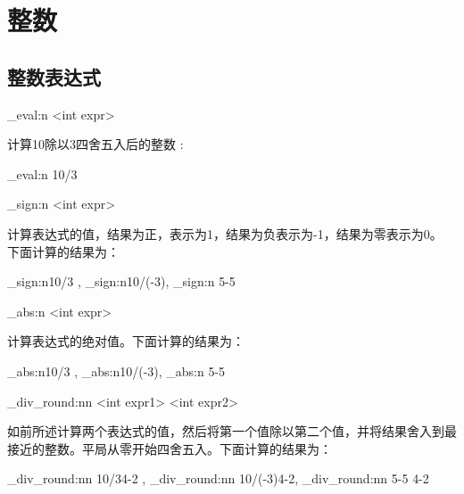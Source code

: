 \section{整数}
\subsection{整数表达式}



\setlength\parskip{0.4ex plus 0.2ex minus 0.2ex}%
\setlength\leftskip{0em}%
\setlength\rightskip{0em}%
\setlength\parindent{2em}%
\begin{my}
	\int_eval:n {<int expr>}
\end{my}

计算10除以3四舍五入后的整数	:

\begin{examplee}	
	\ExplSyntaxOn		
	\int_eval:n {10/3} 	
	\ExplSyntaxOff
\end{examplee}

\begin{my}
	\int_sign:n {<int expr>}
\end{my}

计算表达式的值，结果为正，表示为1，结果为负表示为-1，结果为零表示为0。
下面计算的结果为：

\begin{examplee}
	\ExplSyntaxOn		
	\int_sign:n{10/3} ,
	\int_sign:n{10/(-3)},
	\int_sign:n {5-5}	
	\ExplSyntaxOff
	
\end{examplee}	

\begin{my}
	\int_abs:n {<int expr>}
\end{my}

计算表达式的绝对值。下面计算的结果为：

\begin{examplee}			
	\ExplSyntaxOn		
	\int_abs:n{10/3} ,
	\int_abs:n{10/(-3)},
	\int_abs:n {5-5}	
	\ExplSyntaxOff
\end{examplee}

\begin{my}
	\int_div_round:nn {<int expr1>} {<int expr2>}
\end{my}

如前所述计算两个表达式的值，然后将第一个值除以第二个值，并将结果舍入到最接近的整数。平局从零开始四舍五入。下面计算的结果为：

\begin{examplee}			
	\ExplSyntaxOn		
	\int_div_round:nn {10/3}{4-2} ,
	\int_div_round:nn {10/(-3)}{4-2},
	\int_div_round:nn {5-5}	{4-2}
	\ExplSyntaxOff
\end{examplee}

